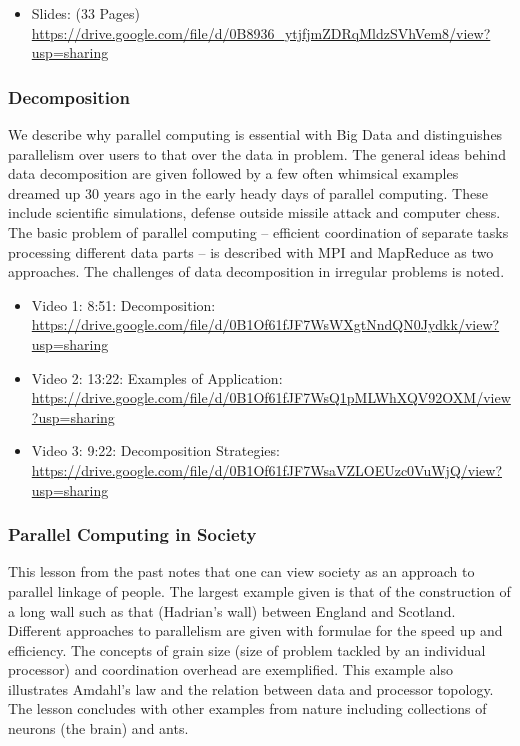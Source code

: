 \begin{itemize}
\tightlist
\item
  Slides: (33 Pages)
  \url{https://drive.google.com/file/d/0B8936_ytjfjmZDRqMldzSVhVem8/view?usp=sharing}
\end{itemize}

\subsubsection{Decomposition}\label{decomposition}

We describe why parallel computing is essential with Big Data and
distinguishes parallelism over users to that over the data in problem.
The general ideas behind data decomposition are given followed by a few
often whimsical examples dreamed up 30 years ago in the early heady days
of parallel computing. These include scientific simulations, defense
outside missile attack and computer chess. The basic problem of parallel
computing -- efficient coordination of separate tasks processing
different data parts -- is described with MPI and MapReduce as two
approaches. The challenges of data decomposition in irregular problems
is noted.

\begin{itemize}
\tightlist
\item
  Video 1: 8:51: Decomposition:
  \url{https://drive.google.com/file/d/0B1Of61fJF7WsWXgtNndQN0Jydkk/view?usp=sharing}
\item
  Video 2: 13:22: Examples of Application:
  \url{https://drive.google.com/file/d/0B1Of61fJF7WsQ1pMLWhXQV92OXM/view?usp=sharing}
\item
  Video 3: 9:22: Decomposition Strategies:
  \url{https://drive.google.com/file/d/0B1Of61fJF7WsaVZLOEUzc0VuWjQ/view?usp=sharing}
\end{itemize}

\subsubsection{Parallel Computing in Society}

This lesson from the past notes that one can view society as an approach
to parallel linkage of people. The largest example given is that of the
construction of a long wall such as that (Hadrian's wall) between
England and Scotland. Different approaches to parallelism are given with
formulae for the speed up and efficiency. The concepts of grain size
(size of problem tackled by an individual processor) and coordination
overhead are exemplified. This example also illustrates Amdahl's law and
the relation between data and processor topology. The lesson concludes
with other examples from nature including collections of neurons (the
brain) and ants.

